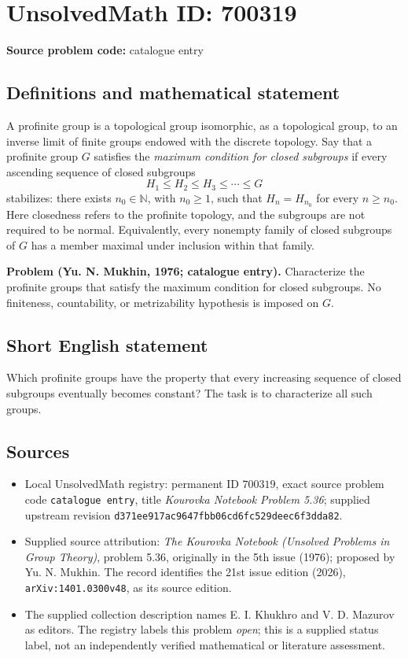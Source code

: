 \documentclass[11pt]{article}
\newcommand{\N}{\mathbb{N}}
\begin{document}
\section*{UnsolvedMath ID: 700319}
\textbf{Source problem code:} catalogue entry
\subsection{Definitions and mathematical statement}
A profinite group is a topological group isomorphic, as a topological group, to an inverse limit of finite groups endowed with the discrete topology. Say that a profinite group \(G\) satisfies the \emph{maximum condition for closed subgroups} if every ascending sequence of closed subgroups
\[
H_1\leq H_2\leq H_3\leq\cdots\leq G
\]
stabilizes: there exists \(n_0\in\N\), with \(n_0\geq 1\), such that \(H_n=H_{n_0}\) for every \(n\geq n_0\). Here closedness refers to the profinite topology, and the subgroups are not required to be normal. Equivalently, every nonempty family of closed subgroups of \(G\) has a member maximal under inclusion within that family.

\textbf{Problem (Yu. N. Mukhin, 1976; catalogue entry).} Characterize the profinite groups that satisfy the maximum condition for closed subgroups. No finiteness, countability, or metrizability hypothesis is imposed on \(G\).
\subsection{Short English statement}
Which profinite groups have the property that every increasing sequence of closed subgroups eventually becomes constant? The task is to characterize all such groups.
\subsection{Sources}
\begin{itemize}
\item Local UnsolvedMath registry: permanent ID \(700319\), exact source problem code \texttt{catalogue entry}, title \emph{Kourovka Notebook Problem 5.36}; supplied upstream revision \texttt{d371ee917ac9647fbb06cd6fc529deec6f3dda82}.
\item Supplied source attribution: \emph{The Kourovka Notebook (Unsolved Problems in Group Theory)}, problem 5.36, originally in the 5th issue (1976); proposed by Yu. N. Mukhin. The record identifies the 21st issue edition (2026), \texttt{arXiv:1401.0300v48}, as its source edition.
\item The supplied collection description names E. I. Khukhro and V. D. Mazurov as editors. The registry labels this problem \emph{open}; this is a supplied status label, not an independently verified mathematical or literature assessment.
\end{itemize}
\end{document}
